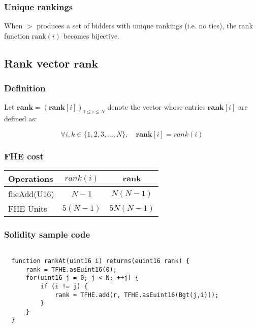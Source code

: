 \subsubsection{Unique rankings}
When $>$ produces a set of bidders with unique rankings (i.e. no ties), the rank function $\text{rank}(i)$ becomes bijective. 


\subsection{Rank vector $\mathbf{rank}$}

\subsubsection{Definition}

Let $\mathbf{rank} = (\mathbf{rank}[i])_{1 \le i \le N}$ denote the vector whose entries $\mathbf{rank}[i]$ are defined as:

\begin{equation*}
    \forall i, k \in \{1, 2, 3, \dots, N\}, \quad \mathbf{rank}[i] = rank(i)
\end{equation*}

\subsubsection{FHE cost}

\renewcommand{\arraystretch}{1.5}
\begin{tabular}{ |l|c|c| }
    \hline    
    Operations & $rank(i)$ & $\mathbf{rank}$ \\ 
    \hline
    fheAdd(U16)          & $N-1$ & $N(N-1)$  \\
    \hline
    \hline
    FHE Units           & $5(N-1)$ & $5N(N-1)$ \\
    \hline
\end{tabular}

\subsubsection{Solidity sample code}

\begin{lstlisting}[language=Solidity]

  function rankAt(uint16 i) returns(euint16 rank) {
      rank = TFHE.asEuint16(0);
      for(uint16 j = 0; j < N; ++j) {
          if (i != j) {
              rank = TFHE.add(r, TFHE.asEuint16(Bgt(j,i)));
          }
      }
  }

\end{lstlisting}

